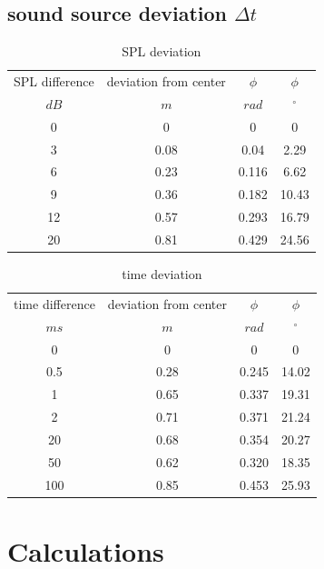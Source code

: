 \documentclass{article}
\begin{document}
\subsection{sound source deviation $\Delta t$}



\begin{table}
\begin{center}
\begin{tabular}{|c||c||c|c|}
\hline
SPL difference & deviation from center & $\phi$ & $\phi$ \\
$dB$	&	$m$	&	$rad$	&	$^\circ$		\\
\hline
\hline
0 & 0 & 0 & 0\\
\hline
3 & 0.08 & 0.04 & 2.29 \\
\hline
6 & 0.23 & 0.116 & 6.62\\
\hline
9 & 0.36 & 0.182 & 10.43\\
\hline
12 & 0.57 & 0.293 & 16.79\\
\hline
20 & 0.81 & 0.429 & 24.56\\
\hline
\end{tabular}
\caption{SPL deviation}
\label{tab:SPL}
\end{center}
\end{table}

\begin{table}
\begin{center}
\begin{tabular}{|c||c||c|c|}
\hline
time difference & deviation from center & $\phi$ & $\phi$ \\
$ms$	&	$m$	&	$rad$	&	$^\circ$		\\
\hline
\hline
0 & 0 & 0 & 0\\
\hline
0.5 & 0.28 & 0.245 & 14.02\\
\hline
1 & 0.65 & 0.337 & 19.31\\
\hline
2 & 0.71 & 0.371 & 21.24\\
\hline
20 & 0.68 & 0.354 & 20.27\\
\hline
50 & 0.62 & 0.320 & 18.35\\
\hline
100 & 0.85 & 0.453 & 25.93\\
\hline
\end{tabular}
\caption{time deviation}
\label{tab:time}
\end{center}
\end{table}

\section{Calculations}
\end{document}
